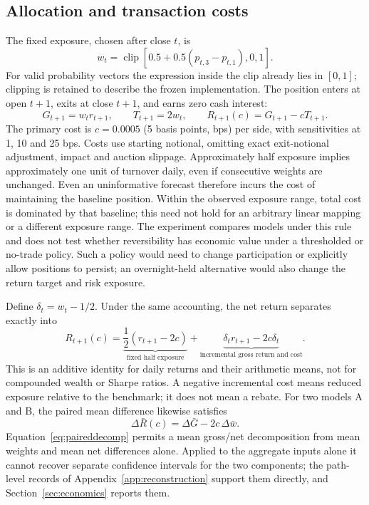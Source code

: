 \subsection{Allocation and transaction costs}
The fixed exposure, chosen after close $t$, is
\begin{equation}
w_t=\operatorname{clip}\left[0.5+0.5(p_{t,3}-p_{t,1}),0,1\right].
\label{eq:weight}
\end{equation}
For valid probability vectors the expression inside the clip already lies in $[0,1]$; clipping is retained to describe the frozen implementation. The position enters at open $t+1$, exits at close $t+1$, and earns zero cash interest:
\begin{equation}
G_{t+1}=w_tr_{t+1},\qquad T_{t+1}=2w_t,\qquad
R_{t+1}(c)=G_{t+1}-cT_{t+1}.
\label{eq:net}
\end{equation}
The primary cost is $c=0.0005$ (5 basis points, bps) per side, with sensitivities at 1, 10 and 25 bps. Costs use starting notional, omitting exact exit-notional adjustment, impact and auction slippage. Approximately half exposure implies approximately one unit of turnover daily, even if consecutive weights are unchanged. Even an uninformative forecast therefore incurs the cost of maintaining the baseline position. Within the observed exposure range, total cost is dominated by that baseline; this need not hold for an arbitrary linear mapping or a different exposure range. The experiment compares models under this rule and does not test whether reversibility has economic value under a thresholded or no-trade policy. Such a policy would need to change participation or explicitly allow positions to persist; an overnight-held alternative would also change the return target and risk exposure.

Define $\delta_t=w_t-1/2$. Under the same accounting, the net return separates exactly into
\begin{equation}
R_{t+1}(c)=\underbrace{\frac{1}{2}(r_{t+1}-2c)}_{\text{fixed half exposure}}
+\underbrace{\delta_t r_{t+1}-2c\delta_t}_{\text{incremental gross return and cost}}.
\label{eq:returndecomp}
\end{equation}
This is an additive identity for daily returns and their arithmetic means, not for compounded wealth or Sharpe ratios. A negative incremental cost means reduced exposure relative to the benchmark; it does not mean a rebate. For two models A and B, the paired mean difference likewise satisfies
\begin{equation}
\Delta\bar R(c)=\Delta\bar G-2c\,\Delta\bar w.
\label{eq:paireddecomp}
\end{equation}
Equation~\eqref{eq:paireddecomp} permits a mean gross/net decomposition from mean weights and mean net differences alone. Applied to the aggregate inputs alone it cannot recover separate confidence intervals for the two components; the path-level records of Appendix~\ref{app:reconstruction} support them directly, and Section~\ref{sec:economics} reports them.

